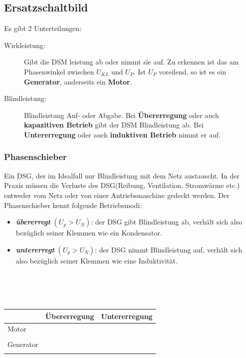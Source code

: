     \subsection{Ersatzschaltbild}
        \begin{minipage}{11cm}
            Es gibt 2 Unterteilungen: \\
            \begin{description}
                \item[Wirkleistung:] Gibt die DSM leistung ab oder nimmt sie auf. Zu erkennen ist das am Phasenwinkel
                zwischen $U_{KL}$ und $U_P$. Ist $U_P$ voreilend, so ist es ein \textbf{Generator}, anderseits ein
                \textbf{Motor}.
                \item[Blindleistung:] Blindleistung Auf- oder Abgabe. Bei \textbf{Übererregung} oder auch \textbf{kapazitiven
                Betrieb} gibt der DSM Blindleistung ab. Bei \textbf{Untererregung} oder auch \textbf{induktiven Betrieb}
                nimmt er auf.
            \end{description}
        \end{minipage}
        \begin{minipage}{8cm}
    	  	\subsubsection{Phasenschieber}
	      	Ein DSG, der im Idealfall nur Blindleistung mit dem Netz austauscht. In der Praxis müssen die Verluste des DSG(Reibung, Ventilation, Stromwärme etc.) entweder vom Netz oder von einer Antriebsmaschine gedeckt werden.
			Der Phasenschieber kennt folgende Betriebsmodi:
     		\begin{itemize}
     			\item \textbf{\emph{übererregt}} $(U_p > U_N)$: der DSG gibt Blindleistung ab, verhält sich also bezüglich seiner Klemmen wie ein Kondensator.
      			\item \textbf{\emph{untererregt}} $(U_p > U_N)$: der DSG nimmt Blindleistung auf, verhält sich also bezüglich seiner Klemmen wie eine Induktivität.
      		\end{itemize}
        \end{minipage}
        \\ \\ \\  
        \begin{tabular}{|l|l|l|}
        \hline
       	& Übererregung & Untererregung \\ 
         \hline
        Motor & & \\
        &
         &
        \\
        \hline
         Generator & & \\
        &
          &
         \\
         \hline
         \end{tabular}
        \renewcommand{\arraystretch}{1.4}
